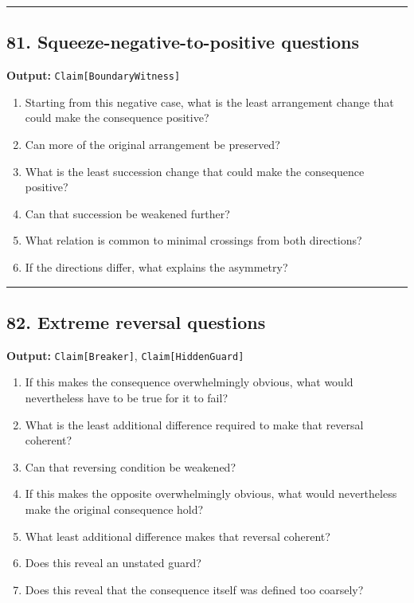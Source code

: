 \documentclass[
]{article}
\providecommand{\tightlist}{%
  \setlength{\itemsep}{0pt}\setlength{\parskip}{0pt}}
\begin{document}
\begin{center}\rule{0.5\linewidth}{0.5pt}\end{center}

\subsection{81. Squeeze-negative-to-positive
questions}\label{squeeze-negative-to-positive-questions}

\textbf{Output:} \texttt{Claim{[}BoundaryWitness{]}}

\begin{enumerate}
\def\labelenumi{\arabic{enumi}.}
\tightlist
\item
  Starting from this negative case, what is the least arrangement change
  that could make the consequence positive?
\item
  Can more of the original arrangement be preserved?
\item
  What is the least succession change that could make the consequence
  positive?
\item
  Can that succession be weakened further?
\item
  What relation is common to minimal crossings from both directions?
\item
  If the directions differ, what explains the asymmetry?
\end{enumerate}

\begin{center}\rule{0.5\linewidth}{0.5pt}\end{center}

\subsection{82. Extreme reversal
questions}\label{extreme-reversal-questions}

\textbf{Output:} \texttt{Claim{[}Breaker{]}},
\texttt{Claim{[}HiddenGuard{]}}

\begin{enumerate}
\def\labelenumi{\arabic{enumi}.}
\tightlist
\item
  If this makes the consequence overwhelmingly obvious, what would
  nevertheless have to be true for it to fail?
\item
  What is the least additional difference required to make that reversal
  coherent?
\item
  Can that reversing condition be weakened?
\item
  If this makes the opposite overwhelmingly obvious, what would
  nevertheless make the original consequence hold?
\item
  What least additional difference makes that reversal coherent?
\item
  Does this reveal an unstated guard?
\item
  Does this reveal that the consequence itself was defined too coarsely?
\end{enumerate}
\end{document}
